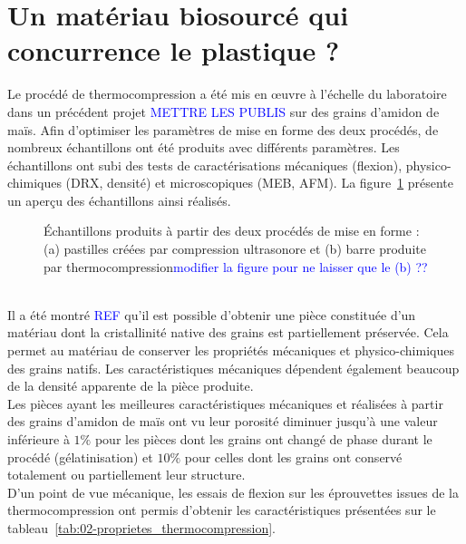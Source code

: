 \section*{Un matériau biosourcé qui concurrence le plastique ?}
Le procédé de thermocompression a été mis en \oe{}uvre à l'échelle du laboratoire dans un précédent projet \textcolor{blue}{METTRE LES PUBLIS} sur des grains d'amidon de maïs. Afin d'optimiser les paramètres de mise en forme des deux procédés, de nombreux échantillons ont été produits avec différents paramètres. Les échantillons ont subi des tests de caractérisations mécaniques (flexion), physico-chimiques (DRX, densité) et microscopiques (MEB, AFM). La figure~\ref{fig:02-echantillons_amidon} présente un aperçu des échantillons ainsi réalisés.
\begin{figure}\centering
	\caption{\label{fig:02-echantillons_amidon}\'Echantillons produits à partir des deux procédés de mise en forme : (a) pastilles créées par compression ultrasonore et (b) barre produite par thermocompression\textcolor{blue}{modifier la figure pour ne laisser que le (b) ??}}
\end{figure}
\\Il a été montré \textcolor{blue}{REF} qu'il est possible d'obtenir une pièce constituée d'un matériau dont la cristallinité native des grains est partiellement préservée. Cela permet au matériau de conserver les propriétés mécaniques et physico-chimiques des grains natifs. Les caractéristiques mécaniques dépendent également beaucoup de la densité apparente de la pièce produite.
\\Les pièces ayant les meilleures caractéristiques mécaniques et réalisées à partir des grains d'amidon de maïs ont vu leur porosité diminuer jusqu'à une valeur inférieure à $1\%$ pour les pièces dont les grains ont changé de phase durant le procédé (gélatinisation) et $10\%$ pour celles dont les grains ont conservé totalement ou partiellement leur structure.
\\D'un point de vue mécanique, les essais de flexion sur les éprouvettes issues de la thermocompression ont permis d'obtenir les caractéristiques présentées sur le tableau~\ref{tab:02-proprietes_thermocompression}.
